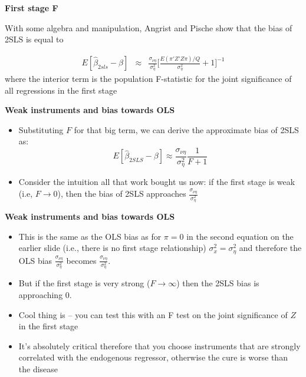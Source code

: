 \documentclass[notes=show]{beamer}
\begin{document}
\begin{frame}[plain]
\begin{center}
\textbf{First stage F}
\end{center}

With some algebra and manipulation, Angrist and Pische show that the bias of 2SLS is equal to

\begin{eqnarray*}
E [ \widehat{\beta}_{2sls} - \beta ] &\approx &  \frac{\sigma_{\nu \eta}}{\sigma^2_\eta} \bigg [ \frac{E(\pi ' Z ' Z \pi)/Q}{\sigma^2_{\eta}} + 1 \bigg ]^{-1}
\end{eqnarray*}where the interior term is the population F-statistic for the joint significance of all regressions in the first stage

\end{frame}

\begin{frame}[plain]

	\begin{center}
	\textbf{Weak instruments and bias towards OLS}
	\end{center}
	
	\begin{itemize}
	\item Substituting $F$ for that big term, we can derive the approximate bias of 2SLS as:$$E[\widehat{\beta}_{2SLS} - \beta] \approx \frac{\sigma_{\nu \eta}}{\sigma^2_\eta} \frac{1}{F+1}$$
	\item Consider the intuition all that work bought us now: if the first stage is weak (i.e, $F\rightarrow{0}$), then the bias of 2SLS approaches $\frac{\sigma_{\nu \eta}}{\sigma^2_\eta}$
	\end{itemize}
\end{frame}

\begin{frame}[plain]

\begin{center}
\textbf{Weak instruments and bias towards OLS}
\end{center}

\begin{itemize}
	\item This is the same as the OLS bias as for $\pi=0$ in the second equation on the earlier slide (i.e., there is no first stage relationship) $\sigma^2_x = \sigma^2_\eta$ and therefore the OLS bias $\frac{\sigma_{\nu \eta}}{\sigma^2_\eta}$ becomes $\frac{\sigma_{\nu \eta}}{\sigma^2_\eta}$.
	\item But if the first stage is very strong ($F\rightarrow{\infty}$) then the 2SLS bias is approaching 0.
	\item Cool thing is -- you can test this with an F test on the joint significance of $Z$ in the first stage
	\item It's absolutely critical therefore that you choose instruments that are strongly correlated with the endogenous regressor, otherwise the cure is worse than the disease
\end{itemize}

\end{frame}
\end{document}
